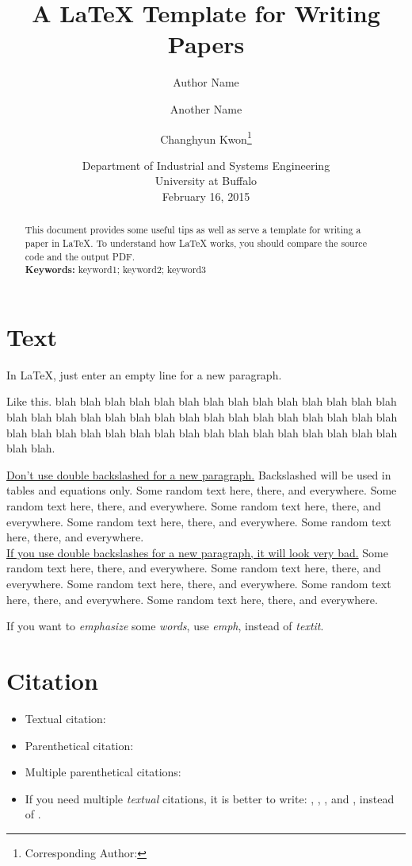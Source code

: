 \documentclass[letterpaper, 11pt]{article}
\title{A LaTeX Template for Writing Papers}
\author{Author Name \and Another Name \and Changhyun Kwon\footnote{Corresponding Author: \email{chkwon@buffalo.edu}}}
\date{Department of Industrial and Systems Engineering\\University at Buffalo\\[0.5cm] February 16, 2015}
\begin{document}
\maketitle

\begin{abstract}
This document provides some useful tips as well as serve a template for writing a paper in LaTeX. To understand how LaTeX works, you should compare the source code and the output PDF.\\
\noindent\textbf{Keywords:} keyword1; keyword2; keyword3
\end{abstract}



\section{Text} \label{sec:paragraph}
In LaTeX, just enter an empty line for a new paragraph.

Like this. blah blah blah blah blah blah blah blah blah blah blah blah blah blah blah blah blah blah blah blah blah blah blah blah blah blah blah blah blah blah blah blah blah blah blah blah blah blah blah blah blah blah blah blah blah blah blah blah.

\uline{Don't use double backslashed for a new paragraph.} Backslashed will be used in tables and equations only. Some random text here, there, and everywhere. Some random text here, there, and everywhere. Some random text here, there, and everywhere. Some random text here, there, and everywhere. Some random text here, there, and everywhere.  \\
\uline{If you use double backslashes for a new paragraph, it will look very bad.} Some random text here, there, and everywhere. Some random text here, there, and everywhere. Some random text here, there, and everywhere. Some random text here, there, and everywhere. Some random text here, there, and everywhere. 

If you want to \emph{emphasize} some \emph{words}, use \emph{emph}, instead of \textit{textit}.




\section{Citation} \label{sec:citation}

\begin{itemize}
\item Textual citation: \citet{Kwon2013rsp}
\item Parenthetical citation: \citep{Kwon2013rsp}
\item Multiple parenthetical citations: \citep{Bertsimas2004,Chaerani2005,Kouvelis1996,gabrel2012recent}
\item If you need multiple \emph{textual} citations, it is better to write: \citet{Bertsimas2004}, \citet{Chaerani2005}, \citet{Kouvelis1996}, and \citet{gabrel2012recent}, instead of \citet{Bertsimas2004,Chaerani2005,Kouvelis1996,gabrel2012recent}.

\end{itemize}
\end{document}
